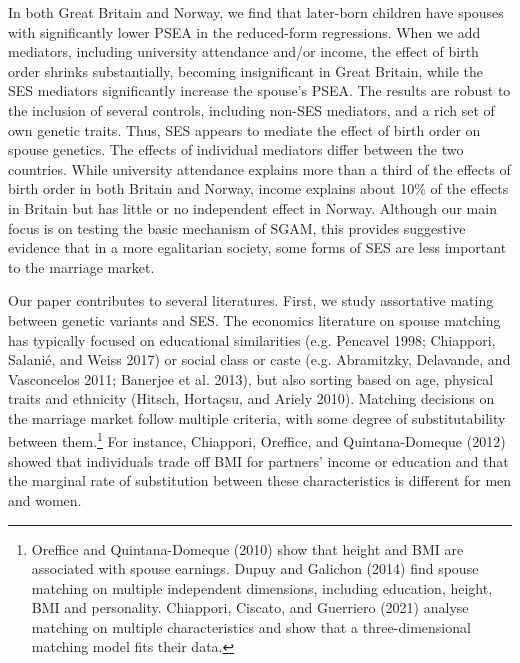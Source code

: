 \documentclass[
  12pt,
]{article}
\theoremstyle{definition}
\theoremstyle{definition}
\theoremstyle{definition}
\theoremstyle{definition}
\theoremstyle{remark}
\begin{document}
In both Great Britain and Norway, we find that later-born children have spouses
with significantly lower PSEA in the reduced-form regressions. When we add
mediators, including university attendance and/or income, the effect of birth
order shrinks substantially, becoming insignificant in Great Britain, while the
SES mediators significantly increase the spouse's PSEA. The results are
robust to the inclusion of several controls, including non-SES mediators, and a
rich set of own genetic traits. Thus, SES appears to mediate the effect of birth
order on spouse genetics. The effects of individual mediators differ between the
two countries. While university attendance explains more than a third of the
effects of birth order in both Britain and Norway, income explains about 10\% of
the effects in Britain but has little or no independent effect in Norway.
Although our main focus is on testing the basic mechanism of SGAM, this provides
suggestive evidence that in a more egalitarian society, some forms of SES are
less important to the marriage market.

Our paper contributes to several literatures. First, we study assortative mating
between genetic variants and SES. The economics literature on spouse matching
has typically focused on educational similarities (e.g. Pencavel 1998; Chiappori, Salanié, and Weiss 2017) or social class or caste (e.g. Abramitzky, Delavande, and Vasconcelos 2011; Banerjee et al. 2013), but also sorting based on age,
physical traits and ethnicity (Hitsch, Hortaçsu, and Ariely 2010). Matching decisions on the
marriage market follow multiple criteria, with some degree of substitutability
between them.\footnote{Oreffice and Quintana-Domeque (2010) show that height and BMI are associated
  with spouse earnings. Dupuy and Galichon (2014) find spouse matching on multiple
  independent dimensions, including education, height, BMI and personality.
  Chiappori, Ciscato, and Guerriero (2021) analyse matching on multiple characteristics
  and show that a three-dimensional matching model fits their data.} For instance, Chiappori, Oreffice, and Quintana-Domeque (2012) showed that
individuals trade off BMI for partners' income or education and that the
marginal rate of substitution between these characteristics is different for men
and women.
\end{document}
